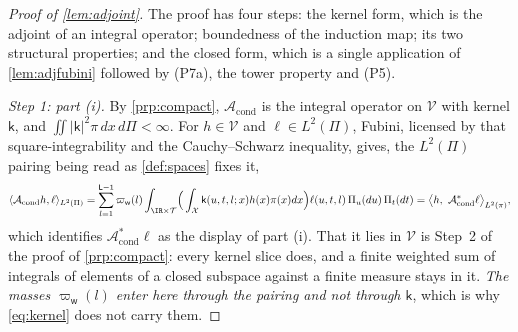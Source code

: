 \begin{proof}[Proof of \cref{lem:adjoint}]
The proof has four steps: the kernel form, which is the adjoint of an integral operator; boundedness of
the induction map; its two structural properties; and the closed form, which is a single application of
\cref{lem:adjfubini} followed by (P7a), the tower property and (P5).

\emph{Step 1: part (i).}
By \cref{prp:compact}, $\mathcal A_{\mathrm{cond}}$ is the integral operator on $\mathcal V$ with kernel
$\mathsf k$, and $\iint|\mathsf k|^{2}\pi\,dx\,d\Pi<\infty$. For $h\in\mathcal V$ and $\ell\in L^{2}(\Pi)$,
Fubini, licensed by that square-integrability and the Cauchy--Schwarz inequality, gives, the
$L^{2}(\Pi)$ pairing being read as \cref{def:spaces} fixes it,
\[
\langle\mathcal A_{\mathrm{cond}}h,\ell\rangle_{L^{2}(\Pi)}
=\sum_{l=1}^{\mathsf L-1}\varpi_{\mathsf w}(l)\int_{\IR\times\mathcal T}\!\Big(\int_{\mathcal X}\mathsf k(u,t,l;x)h(x)\pi(x)dx\Big)\ell(u,t,l)\,\Pi_u(du)\,\Pi_t(dt)
=\big\langle h,\ \mathcal A^\ast_{\mathrm{cond}}\ell\big\rangle_{L^{2}(\pi)},
\]
which identifies $\mathcal A^\ast_{\mathrm{cond}}\ell$ as the display of part (i). That it lies in
$\mathcal V$ is Step~2 of the
proof of \cref{prp:compact}: every kernel slice does, and a finite weighted sum of integrals of elements
of a closed subspace against a finite measure stays in it. \emph{The masses $\varpi_{\mathsf w}(l)$ enter
here through the pairing and not through $\mathsf k$}, which is why \eqref{eq:kernel} does not carry
them.


\end{proof}
